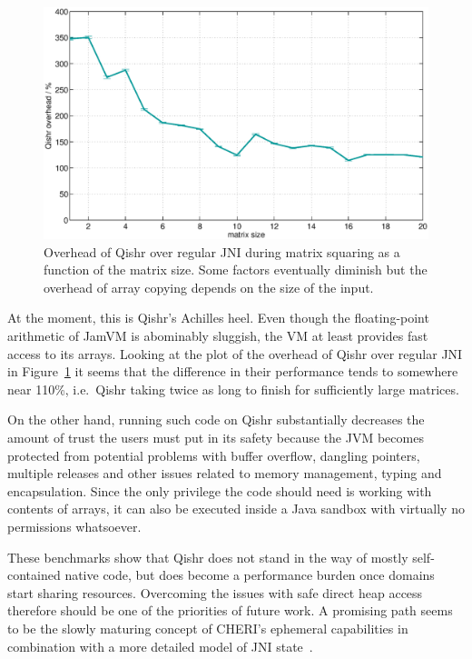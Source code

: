 \documentclass[a4paper,12pt,twoside,openright]{report}
\begin{document}
\begin{figure}
	\centering
	\includegraphics[width=1.1\textwidth]{graph_matrix_subtract.eps}
	\caption{Overhead of Qishr over regular JNI during matrix squaring as a function of the matrix size. Some factors eventually diminish but the overhead of array copying depends on the size of the input.}
	\label{fig:OverheadMatrixSubtract}
\end{figure}

At the moment, this is Qishr's Achilles heel. Even though the floating-point arithmetic of JamVM is abominably sluggish, the VM at least provides fast access to its arrays. Looking at the plot of the overhead of Qishr over regular JNI in Figure~\ref{fig:OverheadMatrixSubtract} it seems that the difference in their performance tends to somewhere near 110\%, i.e.\ Qishr taking twice as long to finish for sufficiently large matrices. 

On the other hand, running such code on Qishr substantially decreases the amount of trust the users must put in its safety because the JVM becomes protected from potential problems with buffer overflow, dangling pointers, multiple releases and other issues related to memory management, typing and encapsulation. Since the only privilege the code should need is working with contents of arrays, it can also be executed inside a Java sandbox with virtually no permissions whatsoever.

These benchmarks show that Qishr does not stand in the way of mostly self-contained native code, but does become a performance burden once domains start sharing resources. Overcoming the issues with safe direct heap access therefore should be one of the priorities of future work. A promising path seems to be the slowly maturing concept of CHERI's ephemeral capabilities in combination with a more detailed model of JNI state~\cite{Tan:2010:JNIFormalModel}. 
\end{document}

